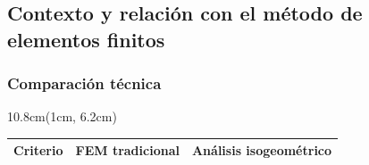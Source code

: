 \documentclass[compress]{beamer}
\begin{document}

\subsection{Contexto y relación con el método de elementos finitos}

\begin{frame}
    \frametitle{Comparación técnica}

    \begin{textblock*}{10.8cm}(1cm, 6.2cm) 
    \end{textblock*}

    \begin{table}[htbp]
        \centering
        \renewcommand{\arraystretch}{1.4}
        \scriptsize 
        \vspace{-1cm}
        \begin{tabular}{>{\raggedright\arraybackslash}p{2.3cm} >{\raggedright\arraybackslash}p{3.9cm} >{\raggedright\arraybackslash}p{3.5cm}}
            \toprule
            \textbf{Criterio} & \textbf{FEM tradicional} & \textbf{Análisis isogeométrico} \\ 
            \midrule
            

\end{tabular}
\end{table}
\end{frame}
\end{document}
